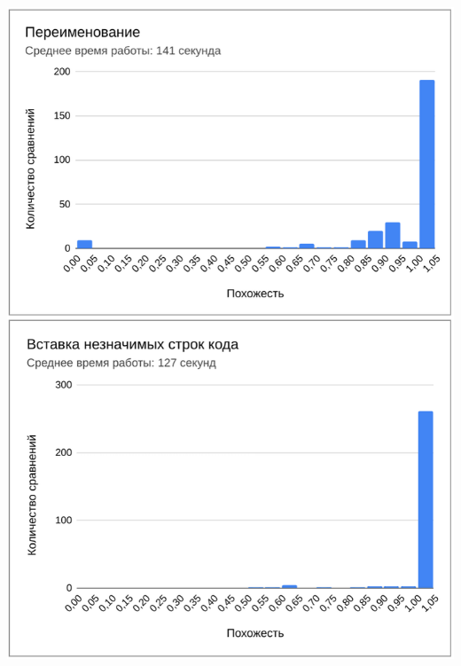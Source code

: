 \documentclass[10pt]{beamer}
\begin{document}
\begin{frame}
\begin{columns}
	\centering
	\includegraphics[scale=0.52]{res2.png}
	
\end{columns}
	
\end{frame}
\end{document}
